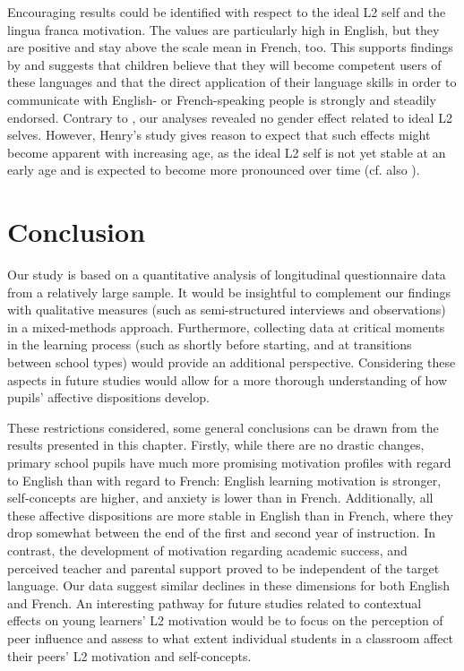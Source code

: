 \documentclass[output=paper]{langsci/langscibook}
\begin{document}
Encouraging results could be identified with respect to the ideal L2 self and the lingua franca motivation. The values are particularly high in English, but they are positive and stay above the scale mean in French, too. This supports findings by \citet{Heinzmann2013} and suggests that children believe that they will become competent users of these languages and that the direct application of their language skills in order to communicate with English- or French-speaking people is strongly and steadily endorsed. Contrary to \citet{Henry2009}, our analyses revealed no gender effect related to ideal L2 selves. However, Henry’s study gives reason to expect that such effects might become apparent with increasing age, as the ideal L2 self is not yet stable at an early age and is expected to become more pronounced over time (cf. also \citealt{Doernyei2009}).

\section{Conclusion}

Our study is based on a quantitative analysis of longitudinal questionnaire data from a relatively large sample. It would be insightful to complement our findings with qualitative measures (such as semi-structured interviews and observations) in a mixed-methods approach. Furthermore, collecting data at critical moments in the learning process (such as shortly before starting, and at transitions between school types) would provide an additional perspective. Considering these aspects in future studies would allow for a more thorough understanding of how pupils' affective dispositions develop.

These restrictions considered, some general conclusions can be drawn from the results presented in this chapter. Firstly, while there are no drastic changes, primary school pupils have much more promising motivation profiles with regard to English than with regard to French: English learning motivation is stronger, self-concepts are higher, and anxiety is lower than in French. Additionally, all these affective dispositions are more stable in English than in French, where they drop somewhat between the end of the first and second year of instruction. In contrast, the development of motivation regarding academic success, and perceived teacher and parental support proved to be independent of the target language. Our data suggest similar declines in these dimensions for both English and French. An interesting pathway for future studies related to contextual effects on young learners’ L2 motivation would be to focus on the perception of peer influence and assess to what extent individual students in a classroom affect their peers’ L2 motivation and self-concepts.


{\sloppy\printbibliography[heading=subbibliography,notkeyword=this]}
\end{document}
